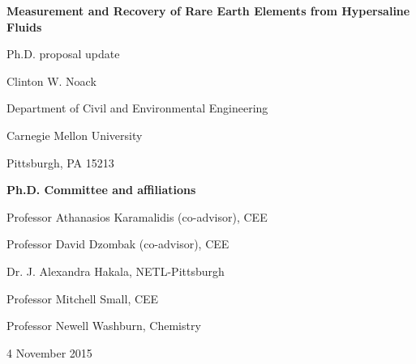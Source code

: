 \thispagestyle{empty}
\begin{center}

\Huge{\textbf{Measurement and Recovery of Rare Earth Elements from Hypersaline Fluids}}
\vspace{1cm}

\normalsize{Ph.D. proposal update}
\vspace{1cm}

\Large{Clinton W. Noack}
\vspace{1cm}

\normalsize{
Department of Civil and Environmental Engineering

Carnegie Mellon University

Pittsburgh, PA 15213}
\vspace{2cm}

\normalsize{
\textbf{Ph.D. Committee and affiliations}

Professor Athanasios Karamalidis (co-advisor), CEE

Professor David Dzombak (co-advisor), CEE

Dr. J. Alexandra Hakala, NETL-Pittsburgh

Professor Mitchell Small, CEE

Professor Newell Washburn, Chemistry
}

\vspace{1cm}


4 November 2015

\end{center}

 \clearpage